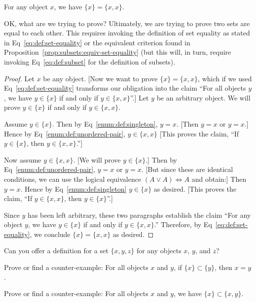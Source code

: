 \begin{proposition}
For any object $x$, we have $\{x\}=\{x,x\}$.
\end{proposition}

OK, what are we trying to prove? Ultimately, we are trying to prove two
sets are equal to each other. This requires invoking the definition of
set equality as stated in Eq~\eqref{eq:def:set-equality} or the
equivalent criterion found in
Proposition~\ref{prop:subsets:equiv-set-equality} (but this will, in
turn, require invoking Eq~\ref{eq:def:subset} for the definition of subsets).

\begin{proof}
Let $x$ be any object. [Now we want to prove $\{x\}=\{x,x\}$, which if
we used Eq~\eqref{eq:def:set-equality} transforms our obligation into
the claim ``For all objects $y$, we have $y\in\{x\}$ if and only if
$y\in\{x,x\}$''.]
Let $y$ be an arbitrary object. We will prove $y\in\{x\}$ if and only if
$y\in\{x,x\}$.

Assume $y\in\{x\}$. Then by Eq~\eqref{enum:def:singleton}, $y=x$. [Then
$y=x$ or $y=x$.] Hence by Eq~\eqref{enum:def:unordered-pair}, $y\in\{x,x\}$
[This proves the claim, ``If $y\in\{x\}$, then $y\in\{x,x\}$.'']

Now assume $y\in\{x,x\}$. [We will prove $y\in\{x\}$.]
Then by Eq~\eqref{enum:def:unordered-pair}, $y=x$ or $y=x$. [But since
these are identical conditions, we can use the logical equivalence
$(A\lor A)\iff A$ and obtain:] Then $y=x$. Hence by Eq~\eqref{enum:def:singleton}
$y\in\{x\}$ as desired. [This proves the claim, ``If $y\in\{x,x\}$,
then $y\in\{x\}$''.]

Since $y$ has been left arbitrary, these two paragraphs establish the
claim ``For any object $y$, we have $y\in\{x\}$ if and only if $y\in\{x,x\}$.''
Therefore, by Eq~\eqref{eq:def:set-equality}, we conclude $\{x\}=\{x,x\}$
as desired.
\end{proof}

\begin{xca}
Can you offer a definition for a set $\{x,y,z\}$ for any objects $x$,
$y$, and $z$?
\end{xca}

\begin{xca}\label{xca:enumerated-sets:singleton-subsets-of-singleton}
Prove or find a counter-example: For all objects $x$ and $y$, if
$\{x\}\subset\{y\}$, then $x=y$.
\end{xca}

\begin{xca}\label{xca:enum:singleton-subset-unordered-pair}
Prove or find a counter-example: For all objects $x$ and $y$, we have $\{x\}\subset\{x,y\}$.
\end{xca}
